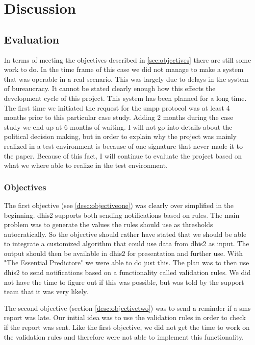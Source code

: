 \chapter{Discussion}

\section{Evaluation}
In terms of meeting the objectives described in \ref{sec:objectives} there are still some work to do.
In the time frame of this case we did not manage to make a system that was operable in a real scenario. 
This was largely due to delays in the system of bureaucracy. 
It cannot be stated clearly enough how this effects the development cycle of this project.
This system has been planned for a long time. 
The first time we initiated the request for the \gls{smpp} protocol was at least 4 months prior to this particular case study. Adding 2 months during the case study we end up at 6 months of waiting.
I will not go into details about the political decision making, but in order to explain why the project was mainly realized in a test environment is because of one signature that never made it to the paper.
Because of this fact, I will continue to evaluate the project based on what we where able to realize in the test environment.

\subsection{Objectives}
The first objective (see \ref{desc:objectiveone}) was clearly over simplified in the beginning.
\gls{dhis2} supports both sending notifications based on rules. The main problem was to generate the values the rules should use as thresholds autocratically. So the objective should rather have stated that we should be able to integrate a customized algorithm that could use data from \gls{dhis2} as input. The output should then be available in \gls{dhis2} for presentation and further use. 
With "The Essential Predictore" we were able to do just this. The plan was to then use \gls{dhis2} to send notifications based on a functionality called validation rules.
We did not have the time to figure out if this was possible, but was told by the support team that it was very likely. 

The second objective (section \ref{desc:objectivetwo}) was to send a reminder if a \gls{sms} report was late. Our initial idea was to use the validation rules in order to check if the report was sent. Like the first objective, we did not get the time to work on the validation rules and therefore were not able to implement this functionality.

